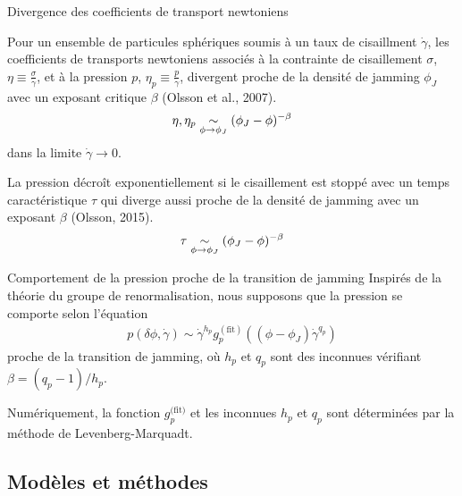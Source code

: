 \documentclass{beamer}
\begin{document}
\begin{frame}{Divergence des coefficients de transport newtoniens}

Pour un ensemble de particules sphériques soumis à un taux de cisaillment $\dot{\gamma}$, les coefficients de transports newtoniens associés à la contrainte de cisaillement $\sigma$, $\eta\equiv\frac{\sigma}{\dot{\gamma}}$, et à la pression $p$, $\eta_p\equiv\frac{p}{\dot{\gamma}}$, divergent proche de la densité de jamming $\phi_J$ avec un exposant critique $\beta$ (Olsson et al., 2007).
\begin{align*}
\eta,\eta_p \underset{\phi\rightarrow\phi_J}{\sim} (\phi_J-\phi)^{-\beta}
\end{align*}
dans la limite $\dot{\gamma}\rightarrow0$.\\
\vspace{10pt}

La pression décroît exponentiellement si le cisaillement est stoppé avec un temps caractéristique $\tau$ qui diverge aussi proche de la densité de jamming avec un exposant $\beta$ (Olsson, 2015).
\begin{align*}
\tau \underset{\phi\rightarrow\phi_J}{\sim} (\phi_J-\phi)^{-\beta}
\end{align*}

\end{frame}

\begin{frame}{Comportement de la pression proche de la transition de jamming}
Inspirés de la théorie du groupe de renormalisation, nous supposons que la pression se comporte selon l'équation
\begin{align*}
p(\delta\phi,\dot{\gamma}) \sim \dot{\gamma}^{h_p} g_p^{(\text{fit})}((\phi-\phi_J)\dot{\gamma}^{q_p})
\end{align*}
proche de la transition de jamming, où $h_p$ et $q_p$ sont des inconnues vérifiant $\beta=(q_p-1)/h_p$.\\
\vspace{10pt}

Numériquement, la fonction $g^{\text{(fit)}}_p$ et les inconnues $h_p$ et $q_p$ sont déterminées par la méthode de Levenberg-Marquadt.

\end{frame}

\subsection{Modèles et méthodes}
\end{document}
